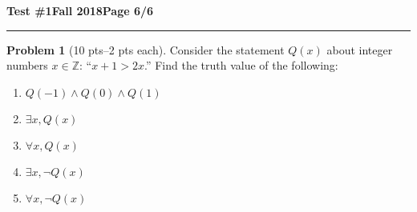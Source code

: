 \documentclass[11pt]{article}
\theoremstyle{definition}
\newtheorem{problem}{Problem}
\begin{document}
\hfill{\large\bf Test \#1}\hfill{\large\bf Fall 2018}\hfill{\large\bf Page 6/6}\hrule

\bigskip

\begin{problem}[10 pts--2 pts each]
  Consider the statement $Q(x)$ about integer numbers $x \in \mathbb{Z}$: ``$x+1 > 2x$.''  Find the truth value of the
  following:
  \begin{enumerate}
  \item $Q(-1) \land Q(0) \land Q(1)$
    \vspace{1cm}
  \item $\exists x, Q(x)$
    \vspace{1cm}
  \item $\forall x, Q(x)$
    \vspace{1cm}
  \item $\exists x, \lnot Q(x)$
    \vspace{1cm}
  \item $\forall x, \lnot Q(x)$
  \end{enumerate}
\end{problem}
\end{document}
